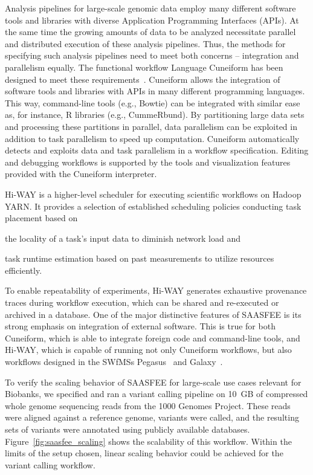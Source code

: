 Analysis pipelines for large-scale genomic data employ many different software tools and libraries with diverse Application Programming Interfaces (APIs). At the same time the growing amounts of data to be analyzed necessitate parallel and distributed execution of these analysis pipelines. Thus, the methods for specifying such analysis pipelines need to meet both concerns -- integration and parallelism equally. The functional workflow Language Cuneiform has been designed to meet these requirements~\cite{Brandt2015}. Cuneiform allows the integration of software tools and libraries with APIs in many different programming languages. This way, command-line tools (e.g., Bowtie) can be integrated with similar ease as, for instance, R libraries (e.g., CummeRbund). By partitioning large data sets and processing these partitions in parallel, data parallelism can be exploited in addition to task parallelism to speed up computation. Cuneiform automatically detects and exploits data and task parallelism in a workflow specification. Editing and debugging workflows is supported by the tools and visualization features provided with the Cuneiform interpreter.

Hi-WAY is a higher-level scheduler for executing scientific workflows on Hadoop YARN. It provides a selection of established scheduling policies conducting task placement based on
\begin{inparaenum}[(a)]
  \item the locality of a task's input data to diminish network load and
  \item task runtime estimation based on past measurements to utilize resources efficiently.
\end{inparaenum}
To enable repeatability of experiments, Hi-WAY generates exhaustive provenance traces during workflow execution, which can be shared and re-executed or archived in a database. One of the major distinctive features of SAASFEE is its strong emphasis on integration of external software. This is true for both Cuneiform, which is able to integrate foreign code and command-line tools, and Hi-WAY, which is capable of running not only Cuneiform workflows, but also workflows designed in the SWfMSs Pegasus~\cite{pegasus_fgcs} and Galaxy~\cite{Goecks10}.

To verify the scaling behavior of SAASFEE for large-scale use cases relevant for Biobanks, we specified and ran a variant calling pipeline on 10~GB of compressed whole genome sequencing reads from the 1000 Genomes Project. These reads were aligned against a reference genome, variants were called, and the resulting sets of variants were annotated using publicly available databases. Figure~\ref{fig:saasfee_scaling} shows the scalability of this workflow. Within the limits of the setup chosen, linear scaling behavior could be achieved for the variant calling workflow.
